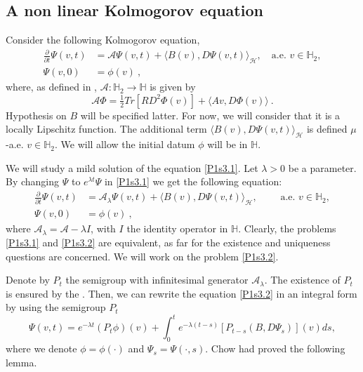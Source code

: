 \documentclass[review,onefignum,onetabnum]{siamart190516}
\begin{document}
\subsection{A non linear Kolmogorov equation}
Consider the following \sloppy Kolmogorov equation,
%
\begin{equation}
    \label{P1s3.1}
    \begin{aligned}
        \frac{\partial}{\partial t}
            \Psi(v,t)
            &=
               \mathcal{A}\Psi(v,t)
                +
                \langle
                    B(v),D\Psi(v,t)
                \rangle_\mathcal{H},
                \quad \text{a.e. }
                v\in\mathbb{H}_2,
        \\
        \Psi(v,0)
            &=
                \phi(v)\nonumber \ ,
    \end{aligned}
\end{equation}
%
where, as defined in ,
$\mathcal{A}:\mathbb{H}_2 \to \mathbb{H}$ is given by
%
\begin{equation}\label{def-A}
    \mathcal{A} \Phi =
        \tfrac{1}{2} Tr[RD^2 \Phi(v)]
        +
        \langle
            A v, D\Phi(v)
        \rangle \ .
 \end{equation}
Hypothesis on $B$ will be specified latter. For now, we will consider that it
is a locally Lipschitz function. The additional term
$ \langle B(v),D\Psi(v,t) \rangle_\mathcal{H}$ is defined $\mu$-a.e.
$v\in\mathbb{H}_2$. We will allow the initial datum $\phi$ will be
in $\mathbb{H}$.

We will study a mild solution of the equation \eqref{P1s3.1}. Let $\lambda>0$
be a parameter. By changing $\Psi$ to $e^{\lambda t}\Psi$ in
\eqref{P1s3.1} we get the following equation:
\begin{align*}
    \label{P1s3.2}
    \frac{\partial}{\partial t}\Psi(v,t)
        &= \mathcal{A}_\lambda\Psi(v,t)
        +
        \langle
            B(v),D\Psi(v,t)
        \rangle_\mathcal{H},
        \qquad \text{ a.e. }
        v \in \mathbb{H}_2,
    \\
    \Psi(v,0)
        &= \phi(v) \ ,
\end{align*}
where $\mathcal{A}_\lambda=\mathcal{A}-\lambda I$, with $I$ the identity
operator in $\mathbb{H}$. Clearly, the problems \eqref{P1s3.1} and
\eqref{P1s3.2} are equivalent, as far for the existence and uniqueness
questions are concerned. We will work on the problem \eqref{P1s3.2}.

    Denote by $P_t$ the semigroup with infinitesimal generator
$\mathcal{A}_\lambda$. The existence of $P_t$ is ensured by the
.
Then, we can rewrite the equation \eqref{P1s3.2} in an integral form by using
the semigroup $P_t$
\begin{equation}
    \Psi(v,t)=
        e^{-\lambda t} (P_t\phi)(v)
        +
        \int_0^t  e^{-\lambda(t-s)}[P_{t-s}(B,D\Psi_s)](v) ds,
\end{equation}
where we denote $\phi=\phi(\cdot)$ and $\Psi_s=\Psi(\cdot,s)$.
Chow \cite{liu} had proved the following lemma.
\end{document}
